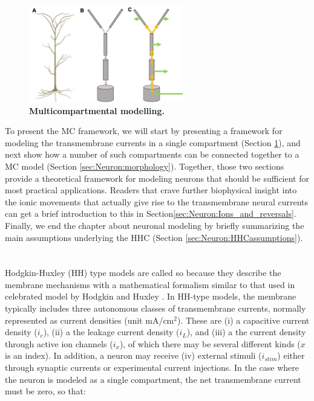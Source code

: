 \begin{figure}[!ht]
\begin{center}
\includegraphics[width=0.6\textwidth]{Figures/Neuron/Multicomp.png}
\end{center}
\caption{\textbf{Multicompartmental modelling.} 
}
\label{Neuron:fig:multicomp}
\end{figure}

To present the MC framework, we will start by presenting a framework for modeling the transmembrane currents in a single compartment (Section \ref{sec:Neuron:membranecurrents}), and next show how a number of such compartments can be connected together to a MC model (Section \ref{sec:Neuron:morphology}). Together, those two sections provide a theoretical framework for modeling neurons that should be sufficient for most practical applications. Readers that crave further biophysical insight into the ionic movements that actually give rise to the transmembrane neural currents can get a brief introduction to this in Section\ref{sec:Neuron:Ions_and_reversals}. Finally, we end the chapter about neuronal modeling by briefly summarizing the main assumptions underlying the HHC (Section \ref{sec:Neuron:HHCassumptions}).


\section{}
\label{sec:Neuron:membranecurrents}
Hodgkin-Huxley (HH) type models are called so because they describe the membrane mechanisms with a mathematical formalism similar to that used in celebrated model by Hodgkin and Huxley \cite{Hodgkin1952}. In HH-type models, the membrane typically includes three autonomous classes of transmembrane currents, normally represented as current densities (unit mA/cm$^2$). These are (i) a capacitive current density ($i_c$), (ii) a the leakage current density ($i_L$), and (iii) a the current density through active ion channels ($i_x$), of which there may be several different kinds ($x$ is an index). In addition, a neuron may receive  (iv) external stimuli ($i_{stim}$) either through synaptic currents or experimental current injections. In the case where the neuron is modeled as a single compartment, the net transmembrane current must be zero, so that:

